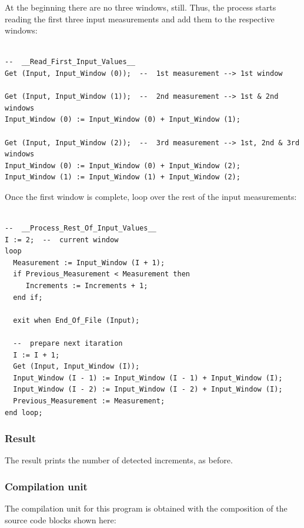 \documentclass[11pt]{article}
\begin{document}
At the beginning there are no three windows, still. Thus, the process starts
reading the first three input measurements and add them to the respective
windows:

\begin{verbatim}

--  __Read_First_Input_Values__
Get (Input, Input_Window (0));  --  1st measurement --> 1st window

Get (Input, Input_Window (1));  --  2nd measurement --> 1st & 2nd windows
Input_Window (0) := Input_Window (0) + Input_Window (1);

Get (Input, Input_Window (2));  --  3rd measurement --> 1st, 2nd & 3rd windows
Input_Window (0) := Input_Window (0) + Input_Window (2);
Input_Window (1) := Input_Window (1) + Input_Window (2);

\end{verbatim}

Once the first window is complete, loop over the rest of the input measurements:

\begin{verbatim}

--  __Process_Rest_Of_Input_Values__
I := 2;  --  current window
loop
  Measurement := Input_Window (I + 1);
  if Previous_Measurement < Measurement then
     Increments := Increments + 1;
  end if;

  exit when End_Of_File (Input);

  --  prepare next itaration
  I := I + 1;
  Get (Input, Input_Window (I));
  Input_Window (I - 1) := Input_Window (I - 1) + Input_Window (I);
  Input_Window (I - 2) := Input_Window (I - 2) + Input_Window (I);
  Previous_Measurement := Measurement;
end loop;

\end{verbatim}

\subsubsection{Result}
\label{sec:orgb2101bd}
The result prints the number of detected increments, as before.

\subsubsection{Compilation unit}
\label{sec:org8c23fbe}
The compilation unit for this program is obtained with the composition of the
source code blocks shown here:
\end{document}

